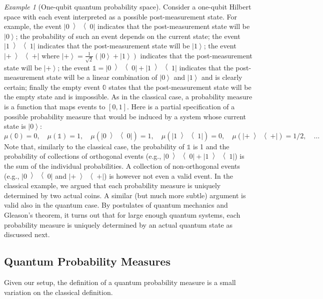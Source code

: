 \documentclass{article}
\theoremstyle{remark}
\newtheorem{example}{Example}
\newcommand{\ket}[1]{{\left\vert{#1}\right\rangle}}
\newcommand{\op}[2]{\ensuremath{\left\vert{#1}\middle\rangle\middle\langle{#2}\right\vert}}
\newcommand{\proj}[1]{\op{#1}{#1}}
\newcommand{\ps}{\texttt{+}}
\begin{document}
\begin{example}[One-qubit quantum probability space] Consider a
  one-qubit Hilbert space with each event interpreted as a possible
  post-measurement state. For example, the event $\proj{0}$ indicates
  that the post-measurement state will be $\ket{0}$; the probability
  of such an event depends on the current state; the event $\proj{1}$
  indicates that the post-measurement state will be $\ket{1}$; the
  event $\proj{\ps}$ where
  $\ket{\ps}=\frac{1}{\sqrt{2}}(\ket{0}+\ket{1})$ indicates that the
  post-measurement state will be $\ket{\ps}$; the event
  $\mathbb{1}=\proj{0}+\proj{1}$ indicates that the post-measurement
  state will be a linear combination of $\ket{0}$ and $\ket{1}$ and is
  clearly certain; finally the empty event $\mathbb{0}$ states that
  the post-measurement state will be the empty state and is
  impossible. As in the classical case, a probability measure is a
  function that maps events to $[0,1]$. Here is a partial
  specification of a possible probability measure that would be
  induced by a system whose current state is $\ket{0}$:
\[
\mu\left(\mathbb{0}\right)=0,\quad
\mu\left(\mathbb{1}\right)=1,\quad
\mu\left(\proj{0}\right)=1,\quad
\mu\left(\proj{1}\right)=0,\quad
\mu\left(\proj{\ps}\right)=1/2,\quad
\ldots
\]
Note that, similarly to the classical case, the probability of
$\mathbb{1}$ is 1 and the probability of collections of orthogonal
events (e.g., $\proj{0}+\proj{1}$) is the sum of the individual
probabilities.  A collection of non-orthogonal events (e.g.,
$\proj{0}$ and $\proj{\ps}$) is however not even a valid event. In the
classical example, we argued that each probability measure is uniquely
determined by two actual coins. A similar (but much more subtle)
argument is valid also in the quantum case. By postulates of quantum
mechanics and Gleason's theorem, it turns out that for large enough
quantum systems, each probability measure is uniquely determined by an
actual quantum state as discussed next.
\end{example}

\subsection{Quantum Probability Measures}

Given our setup, the definition of a quantum probability measure is a
small variation on the classical definition. 
\end{document}
